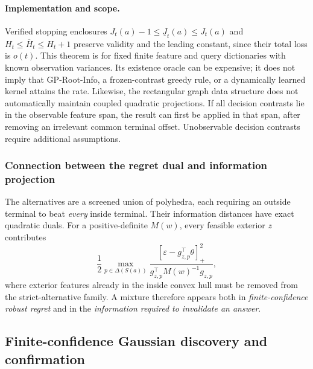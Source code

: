 \documentclass{article}
\theoremstyle{plain}
\theoremstyle{definition}
\begin{document}
\paragraph{Implementation and scope.}
Verified stopping enclosures
$J_t(a)-1\le\underline J_t(a)\le J_t(a)$ and
$H_t\le\overline H_t\le H_t+1$ preserve validity and the leading
constant, since their total loss is $o(t)$.  This theorem is for fixed
finite feature and query dictionaries with known observation variances.
Its existence oracle can be expensive; it does not imply that
GP-Root-Info, a frozen-contrast greedy rule, or a dynamically learned
kernel attains the rate.  Likewise, the rectangular graph data structure
does not automatically maintain coupled quadratic projections.  If all
decision contrasts lie in the observable feature span, the result can
first be applied in that span, after removing an irrelevant common
terminal offset.  Unobservable decision contrasts require additional
assumptions.

\subsubsection{Connection between the regret dual and information projection}
\label{app:full-technical-statements}

The alternatives are a screened union of polyhedra, each requiring an outside terminal to beat \emph{every} inside terminal. Their information distances have exact quadratic duals. For a positive-definite $M(w)$, every feasible exterior $z$ contributes
\begin{equation}
\frac12\max_{p\in\Delta(S(a))}\frac{[\varepsilon-g_{z,p}^\top\theta]_+^2}{g_{z,p}^\top M(w)^{-1}g_{z,p}},
\label{eq:t5-proj-dual}
\end{equation}
where exterior features already in the inside convex hull must be removed from the strict-alternative family. A mixture therefore appears both in \emph{finite-confidence robust regret} and in the \emph{information required to invalidate an answer}.

\subsection{Finite-confidence Gaussian discovery and confirmation}
\label{app:bay-finite}\label{sec:v10g}
\end{document}
